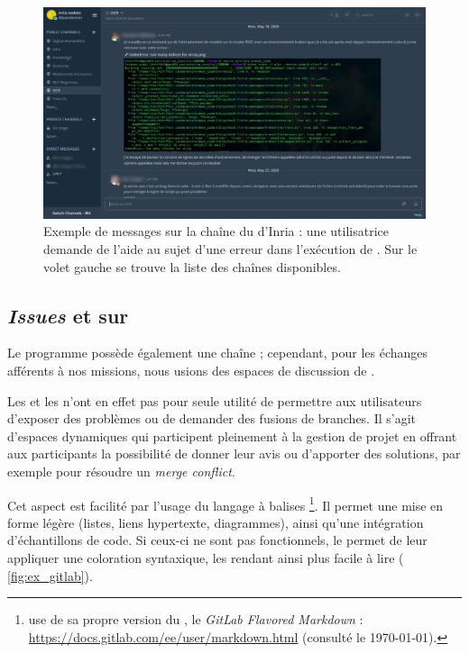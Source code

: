 \begin{figure}
    \centering
    \includegraphics[width=16cm]{img/mattermost.jpg}
    \caption{Exemple de messages sur la chaîne \og \ocr \fg{} du \Mattermost{} d'Inria : une utilisatrice demande de l'aide au sujet d'une erreur dans l'exécution de \kraken{}. Sur le volet gauche se trouve la liste des chaînes disponibles.}
    \label{fig:mattermost}
\end{figure}

\subsection{\textit{Issues} et \mergerequests{} sur \gitlab}

Le programme \timeus{} possède également une chaîne ; cependant, pour les échanges afférents à nos missions, nous usions des espaces de discussion de \gitlab.

Les \issues{} et les \mergerequests{} n'ont en effet pas pour seule utilité de permettre aux utilisateurs d'exposer des problèmes ou de demander des fusions de branches. Il s'agit d'espaces dynamiques qui participent pleinement à la gestion de projet en offrant aux participants la possibilité de donner leur avis ou d'apporter des solutions, par exemple pour résoudre un \textit{merge conflict}.

Cet aspect est facilité par l'usage du langage à balises \markdown\footnote{\gitlab{} use de sa propre version du \markdown, le \textit{GitLab Flavored Markdown} : \url{https://docs.gitlab.com/ee/user/markdown.html} (consulté le \today).}. Il permet une mise en forme légère (listes, liens hypertexte, diagrammes), ainsi qu'une intégration d'échantillons de code. Si ceux-ci ne sont pas fonctionnels, le \markdown{} permet de leur appliquer une coloration syntaxique, les rendant ainsi plus facile à lire (\fig{} \ref{fig:ex_gitlab}).

